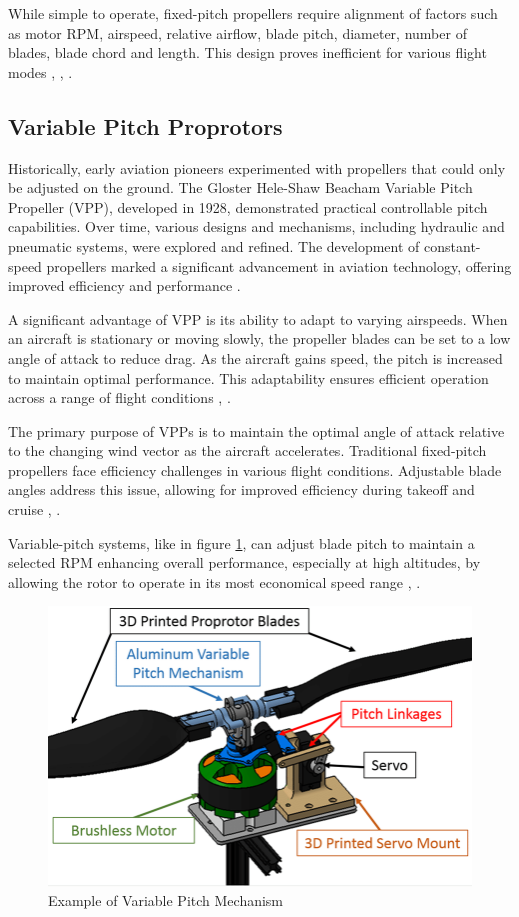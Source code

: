 While simple to operate, fixed-pitch propellers require alignment of factors such as motor \gls{RPM}, airspeed, relative airflow, blade pitch, diameter, number of blades, blade chord and length.
This design proves inefficient for various flight modes \cite{main_uav}, \cite{FPP6}, \cite{FPP7}.

\subsection{Variable Pitch Proprotors}
Historically, early aviation pioneers experimented with propellers that could only be adjusted on the ground.
The Gloster Hele-Shaw Beacham Variable Pitch Propeller (VPP), developed in 1928, demonstrated practical controllable pitch capabilities.
Over time, various designs and mechanisms, including hydraulic and pneumatic systems, were explored and refined.
The development of constant-speed propellers marked a significant advancement in aviation technology, offering improved efficiency and performance \cite{VPP2}.

A significant advantage of VPP is its ability to adapt to varying airspeeds.
When an aircraft is stationary or moving slowly, the propeller blades can be set to a low angle of attack to reduce drag.
As the aircraft gains speed, the pitch is increased to maintain optimal performance.
This adaptability ensures efficient operation across a range of flight conditions \cite{main_uav}, \cite{VPP1}.

The primary purpose of VPPs is to maintain the optimal angle of attack relative to the changing wind vector as the aircraft accelerates.
Traditional fixed-pitch propellers face efficiency challenges in various flight conditions.
Adjustable blade angles address this issue, allowing for improved efficiency during takeoff and cruise \cite{VPP2}, \cite{VPP3}.

Variable-pitch systems, like in figure \ref{fig:vpp_example}, can adjust blade pitch to maintain a selected \gls{RPM} enhancing overall performance, especially at high altitudes, by allowing the rotor to operate in its most economical speed range \cite{VPP2}, \cite{VPP3}.

\begin{figure}[H]
    \centering
    \includegraphics[scale=0.4]{ch2/assets/vpp_example.png}
    \caption{Example of Variable Pitch Mechanism \cite{VPP4}}
    \label{fig:vpp_example}
\end{figure}

